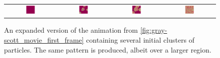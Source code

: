 \begin{figure}[h]
\centering
\mySfFamily
\begin{tabular}{c c c c}
\includegraphics[width = 0.19\textwidth]{../images_CMYK/f038_100_multi_Moment_1} & \includegraphics[width = 0.19\textwidth]{../images_CMYK/f038_100_multi_Moment_2} & \includegraphics[width = 0.19\textwidth]{../images_CMYK/f038_100_multi_Moment_3} & \includegraphics[width = 0.19\textwidth]{../images_CMYK/f038_100_multi_Moment_4}
\end{tabular}
\caption{An expanded version of the animation from \autoref{fig:gray-scott_movie_first_frame} containing several initial clusters of  particles. The same pattern is produced, albeit over a larger region.}
\label{fig:gray-scott_multiple_predators_first_frame}
\end{figure}

